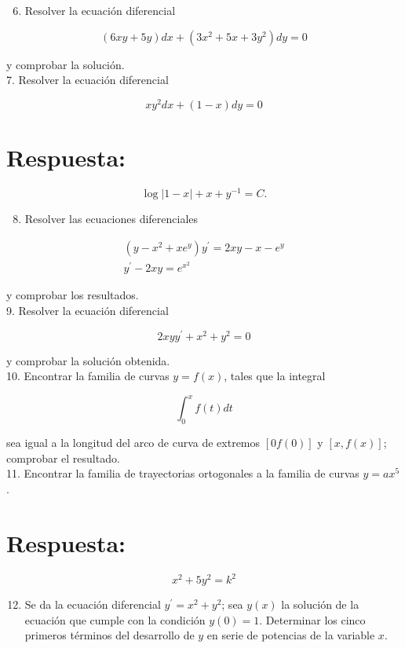 \documentclass[10pt]{article}
\theoremstyle{plain}
\theoremstyle{definition}
\theoremstyle{remark}
\begin{document}
\begin{enumerate}
  \setcounter{enumi}{5}
  \item Resolver la ecuación diferencial
\end{enumerate}

$$
(6 x y+5 y) d x+\left(3 x^{2}+5 x+3 y^{2}\right) d y=0
$$

y comprobar la solución.\\
7. Resolver la ecuación diferencial

$$
x y^{2} d x+(1-x) d y=0
$$

\section*{Respuesta:}
$$
\log |1-x|+x+y^{-1}=C .
$$

\begin{enumerate}
  \setcounter{enumi}{7}
  \item Resolver las ecuaciones diferenciales
\end{enumerate}

$$
\begin{gathered}
\left(y-x^{2}+x e^{y}\right) y^{\prime}=2 x y-x-e^{y} \\
y^{\prime}-2 x y=e^{x^{2}}
\end{gathered}
$$

y comprobar los resultados.\\
9. Resolver la ecuación diferencial

$$
2 x y y^{\prime}+x^{2}+y^{2}=0
$$

y comprobar la solución obtenida.\\
10. Encontrar la familia de curvas $y=f(x)$, tales que la integral

$$
\int_{0}^{x} f(t) d t
$$

sea igual a la longitud del arco de curva de extremos $[0 f(0)]$ y $[x, f(x)]$; comprobar el resultado.\\
11. Encontrar la familia de trayectorias ortogonales a la familia de curvas $y=a x^{5}$.

\section*{Respuesta:}
$$
x^{2}+5 y^{2}=k^{2}
$$

\begin{enumerate}
  \setcounter{enumi}{11}
  \item Se da la ecuación diferencial $y^{\prime}=x^{2}+y^{2}$; sea $y(x)$ la solución de la ecuación que cumple con la condición $y(0)=1$. Determinar los cinco primeros términos del desarrollo de $y$ en serie de potencias de la variable $x$.
\end{enumerate}
\end{document}
